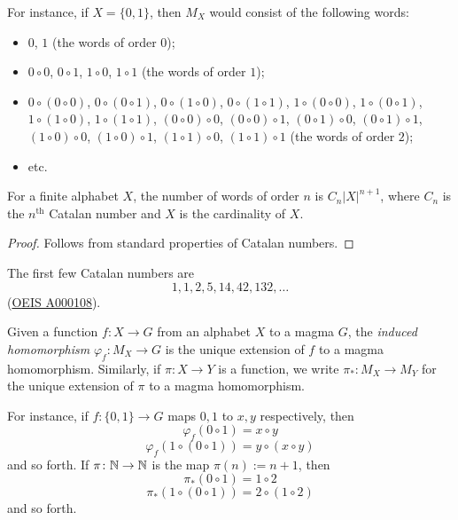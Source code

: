 For instance, if $X = \{0,1\}$, then $M_X$ would consist of the following words:
\begin{itemize}
  \item $0$, $1$ (the words of order $0$);
  \item $0 \circ 0$, $0 \circ 1$, $1 \circ 0$, $1 \circ 1$ (the words of order $1$);
  \item $0 \circ (0 \circ 0)$, $0 \circ (0 \circ 1)$, $0 \circ (1 \circ 0)$, $0 \circ (1 \circ 1)$, $1 \circ (0 \circ 0)$, $1 \circ (0 \circ 1)$, $1 \circ (1 \circ 0)$, $1 \circ (1 \circ 1)$, $(0 \circ 0) \circ 0$, $(0 \circ 0) \circ 1$, $(0 \circ 1) \circ 0$, $(0 \circ 1) \circ 1$, $(1 \circ 0) \circ 0$, $(1 \circ 0) \circ 1$, $(1 \circ 1) \circ 0$, $(1 \circ 1) \circ 1$ (the words of order $2$);
  \item etc.
\end{itemize}

\begin{lemma} \leanok {} For a finite alphabet $X$, the number of words of order $n$ is $C_n |X|^{n+1}$, where $C_n$ is the $n^{\mathrm{th}}$ Catalan number and $X$ is the cardinality of $X$.
\end{lemma}

\begin{proof} \leanok Follows from standard properties of Catalan numbers.
\end{proof}

The first few Catalan numbers are
$$ 1, 1, 2, 5, 14, 42, 132, \dots$$
(\href{https://oeis.org/A000108}{OEIS A000108}).


\begin{definition}\label{induced-def}  Given a function $f: X \to G$ from an alphabet $X$ to a magma $G$, the \emph{induced homomorphism} $\varphi_f: M_X \to G$ is the unique extension of $f$ to a magma homomorphism.  Similarly, if $\pi \colon X \to Y$ is a function, we write $\pi_* \colon M_X \to M_Y$ for the unique extension of $\pi$ to a magma homomorphism.
\end{definition}

For instance, if $f : \{0,1\} \to G$ maps $0,1$ to $x,y$ respectively, then
$$ \varphi_f(0 \circ 1) = x \circ y$$
$$ \varphi_f(1 \circ (0 \circ 1)) = y \circ (x \circ y)$$
and so forth.  If $\pi \colon \mathbb{N} \to \mathbb{N}$ is the map $\pi(n) := n+1$, then
$$ \pi_*(0 \circ 1) = 1 \circ 2$$
$$ \pi_*(1 \circ (0 \circ 1)) = 2 \circ (1 \circ 2)$$
and so forth.

